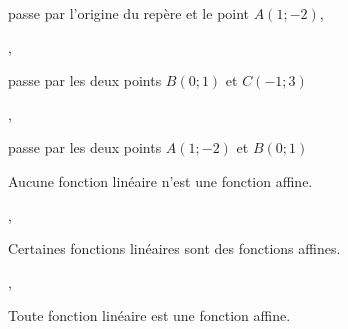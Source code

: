 \ifdefined\COMPLETE
\else
    
    
\fi

\begin{alterqcm}[lq=8cm %
]
 
  

  {%
   {\begin{minipage}[t]{8cm} passe par l'origine du repère et le point $A(1;-2)$, \end{minipage}},
   {\begin{minipage}[t]{8cm}  passe par les deux points $B(0;1)$ et $C(-1;3)$ 
    \end{minipage}},
   {\begin{minipage}[t]{8cm}  passe par les deux points $A(1;-2)$ et $B(0;1)$ 
    \end{minipage}}
 }


 \AQquestion[br=3]{~}
  {%
   {\begin{minipage}[t]{9cm}  Aucune fonction linéaire n'est une fonction affine. \end{minipage}},
   {\begin{minipage}[t]{9cm}  Certaines fonctions linéaires sont des fonctions affines. 
    \end{minipage}},
   {\begin{minipage}[t]{9cm}  Toute fonction linéaire est une fonction affine.
    \end{minipage}}
 }
 
 

\end{alterqcm}
